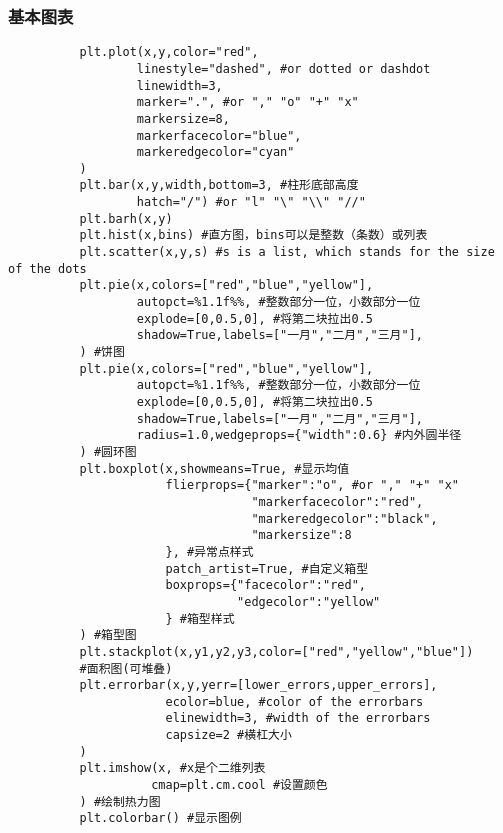\documentclass{article}
\begin{document}
      \subsubsection{基本图表}  
        \begin{lstlisting}
          plt.plot(x,y,color="red",
                  linestyle="dashed", #or dotted or dashdot
                  linewidth=3,
                  marker=".", #or "," "o" "+" "x"
                  markersize=8,
                  markerfacecolor="blue",
                  markeredgecolor="cyan"
          )
          plt.bar(x,y,width,bottom=3, #柱形底部高度
                  hatch="/") #or "l" "\" "\\" "//"
          plt.barh(x,y)
          plt.hist(x,bins) #直方图，bins可以是整数（条数）或列表
          plt.scatter(x,y,s) #s is a list, which stands for the size of the dots
          plt.pie(x,colors=["red","blue","yellow"],
                  autopct=%1.1f%%, #整数部分一位，小数部分一位
                  explode=[0,0.5,0], #将第二块拉出0.5
                  shadow=True,labels=["一月","二月","三月"],
          ) #饼图
          plt.pie(x,colors=["red","blue","yellow"],
                  autopct=%1.1f%%, #整数部分一位，小数部分一位
                  explode=[0,0.5,0], #将第二块拉出0.5
                  shadow=True,labels=["一月","二月","三月"],
                  radius=1.0,wedgeprops={"width":0.6} #内外圆半径
          ) #圆环图
          plt.boxplot(x,showmeans=True, #显示均值
                      flierprops={"marker":"o", #or "," "+" "x"
                                  "markerfacecolor":"red",
                                  "markeredgecolor":"black",
                                  "markersize":8
                      }, #异常点样式
                      patch_artist=True, #自定义箱型
                      boxprops={"facecolor":"red",
                                "edgecolor":"yellow"
                      } #箱型样式
          ) #箱型图
          plt.stackplot(x,y1,y2,y3,color=["red","yellow","blue"]) 
          #面积图(可堆叠)
          plt.errorbar(x,y,yerr=[lower_errors,upper_errors],
                      ecolor=blue, #color of the errorbars
                      elinewidth=3, #width of the errorbars
                      capsize=2 #横杠大小
          )
          plt.imshow(x, #x是个二维列表
                    cmap=plt.cm.cool #设置颜色
          ) #绘制热力图
          plt.colorbar() #显示图例
        \end{lstlisting}
\end{document}
